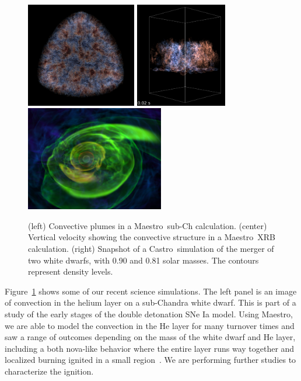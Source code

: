 \documentclass[a4paper]{jpconf}
\newcommand{\maestro}{{\sffamily Maestro}}
\newcommand{\castro}{{\sffamily Castro}}
\begin{document}
\begin{figure}[t]
\centering \includegraphics[height=1.8in]{subch_h}
\includegraphics[height=1.8in]{xrb_compact}
\includegraphics[height=1.8in]{wdmerger_08030_new}
\caption{\label{fig:current-runs} (left) Convective plumes in a
  \maestro\ sub-Ch calculation. (center) Vertical velocity showing the
  convective structure in a \maestro\ XRB calculation. (right)
  Snapshot of a \castro\ simulation of the merger of two white dwarfs,
  with 0.90 and 0.81 solar masses. The contours represent density
  levels.}
\end{figure}

Figure~\ref{fig:current-runs} shows some of our recent science
simulations.  The left panel is an image of convection in the helium
layer on a sub-Chandra white dwarf.  This is part of a study of the
early stages of the double detonation SNe Ia model.  Using \maestro,
we are able to model the convection in the He layer for many turnover
times and saw a range of outcomes depending on the mass of the white
dwarf and He layer, including a both nova-like behavior where the
entire layer runs way together and localized
burning ignited in a small region~\cite{subchandra2}.
We are performing further studies to characterize the ignition.
\end{document}
